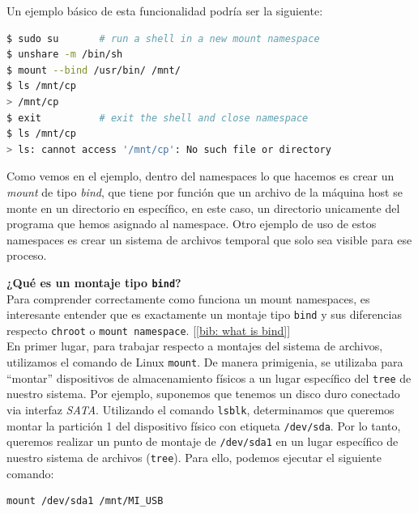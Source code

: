 \documentclass[12pt]{article}
\begin{document}
	
	\noindent Un ejemplo básico de esta funcionalidad podría ser la siguiente:
	
	\addvspace{10px}
	
	\begin{lstlisting}[language=bash, caption=Uso de \texttt{mount namespace} con ``bind'']
$ sudo su		# run a shell in a new mount namespace
$ unshare -m /bin/sh
$ mount --bind /usr/bin/ /mnt/
$ ls /mnt/cp
> /mnt/cp
$ exit			# exit the shell and close namespace
$ ls /mnt/cp
> ls: cannot access '/mnt/cp': No such file or directory
	\end{lstlisting}

	\addvspace{10px}
	
	\par \noindent Como vemos en el ejemplo, dentro del namespaces lo que hacemos es crear un \textit{mount} de tipo \textit{bind}, que tiene por función que un archivo de la máquina host se monte en un directorio en específico, en este caso, un directorio unicamente del programa que hemos asignado al namespace. Otro ejemplo de uso de estos namespaces es crear un sistema de archivos temporal que solo sea visible para ese proceso.
	
	\pagebreak
	
	\noindent \textbf{\large ¿Qué es un montaje tipo \texttt{bind}?}\\
	
	\noindent Para comprender correctamente como funciona un mount namespaces, es interesante entender que es exactamente un montaje tipo \texttt{bind} y sus diferencias respecto \texttt{chroot} o \texttt{mount namespace}. [\ref{bib: what is bind}] \\
	
	\noindent En primer lugar, para trabajar respecto a montajes del sistema de archivos, utilizamos el comando de Linux \texttt{mount}. De manera primigenia, se utilizaba para ``montar'' dispositivos de almacenamiento físicos a un lugar específico del \texttt{tree} de nuestro sistema. Por ejemplo, suponemos que tenemos un disco duro conectado via interfaz \textit{SATA}. Utilizando el comando \texttt{lsblk}, determinamos que queremos montar la partición 1 del dispositivo físico con etiqueta \texttt{/dev/sda}. Por lo tanto, queremos realizar un punto de montaje de \texttt{/dev/sda1} en un lugar específico de nuestro sistema de archivos (\texttt{tree}). Para ello, podemos ejecutar el siguiente comando:
	\begin{verbatim}
mount /dev/sda1 /mnt/MI_USB
	\end{verbatim}
\end{document}
